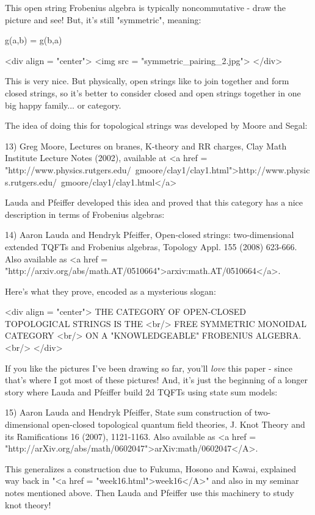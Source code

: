 This open string Frobenius algebra
is typically noncommutative - draw the picture and see!  But, it's
still "symmetric", meaning:

g(a,b) = g(b,a)

<div align = "center">
<img src = "symmetric_pairing_2.jpg">
</div>

This is very nice.  But physically, open strings like to join together
and form closed strings, so it's better to consider closed and open
strings together in one big happy family... or category.  

The idea of doing this for topological strings was developed by
Moore and Segal:

13) Greg Moore, Lectures on branes, K-theory and RR charges, Clay 
Math Institute Lecture Notes (2002), available at 
<a href = "http://www.physics.rutgers.edu/~gmoore/clay1/clay1.html">http://www.physics.rutgers.edu/~gmoore/clay1/clay1.html</a>

Lauda and Pfeiffer developed this idea and proved that this category
has a nice description in terms of Frobenius algebras:

14) Aaron Lauda and Hendryk Pfeiffer, Open-closed strings:
two-dimensional extended TQFTs and Frobenius algebras, Topology
Appl. 155 (2008) 623-666.  Also available as <a href =
"http://arxiv.org/abs/math.AT/0510664">arxiv:math.AT/0510664</a>.

Here's what they prove, encoded as a mysterious slogan:

<div align = "center">
        THE CATEGORY OF OPEN-CLOSED TOPOLOGICAL STRINGS IS THE <br/>
                  FREE SYMMETRIC MONOIDAL CATEGORY <br/>
               ON A "KNOWLEDGEABLE" FROBENIUS ALGEBRA.<br/>
</div>

If you like the pictures I've been drawing so far, you'll \emph{love}
this paper - since that's where I got most of these pictures!
And, it's just the beginning of a longer story where 
Lauda and Pfeiffer build 2d TQFTs using state sum models:

15) Aaron Lauda and Hendryk Pfeiffer, State sum construction of
two-dimensional open-closed topological quantum field theories,
J. Knot Theory and its Ramifications 16 (2007), 1121-1163.  Also
available as <a href =
"http://arXiv.org/abs/math/0602047">arXiv:math/0602047</A>.

This generalizes a construction due to Fukuma, Hosono and Kawai,
explained way back in "<a href = "week16.html">week16</A>"
and also in my seminar notes mentioned above.  Then Lauda and Pfeiffer
use this machinery to study knot theory!

